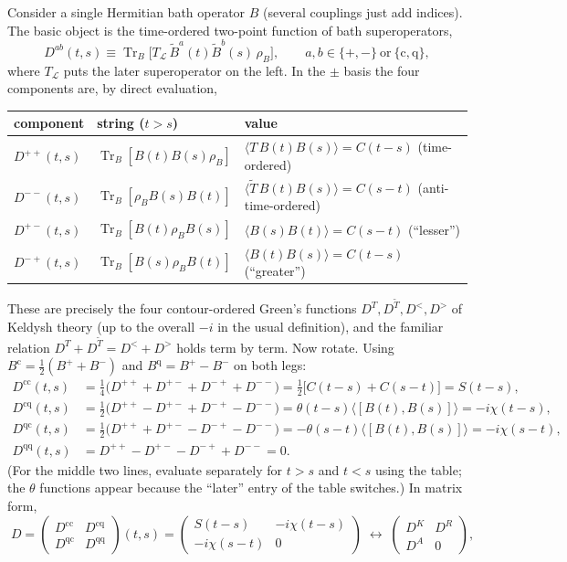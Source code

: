 \documentclass[11pt]{article}
\newcommand{\Tr}{\operatorname{Tr}}
\newcommand{\Lc}{\mathcal{L}}
\newcommand{\cl}{\mathrm{c}}
\newcommand{\qu}{\mathrm{q}}
\newcommand{\rhoB}{\rho_{B}}
\newcommand{\avg}[1]{\langle#1\rangle}
\begin{document}
Consider a single Hermitian bath operator $B$ (several couplings just add indices). The
basic object is the time-ordered two-point function of bath superoperators,
\begin{equation}
  D^{ab}(t,s)\equiv\Tr_B\!\big[T_{\!\Lc}\,\tilde B^{a}(t)\tilde B^{b}(s)\,\rhoB\big],\qquad a,b\in\{+,-\}\ \text{or}\ \{\cl,\qu\},
\end{equation}
where $T_{\!\Lc}$ puts the later superoperator on the left. In the $\pm$ basis the four
components are, by direct evaluation,
\begin{center}
\renewcommand{\arraystretch}{1.3}
\begin{tabular}{@{}lll@{}}
\toprule
component & string ($t>s$) & value \\
\midrule
$D^{++}(t,s)$ & $\Tr_B[B(t)B(s)\rhoB]$ & $\avg{T\,B(t)B(s)}=C(t-s)$ \quad (time-ordered)\\
$D^{--}(t,s)$ & $\Tr_B[\rhoB B(s)B(t)]$ & $\avg{\tilde T\,B(t)B(s)}=C(s-t)$ \quad (anti-time-ordered)\\
$D^{+-}(t,s)$ & $\Tr_B[B(t)\rhoB B(s)]$ & $\avg{B(s)B(t)}=C(s-t)$ \quad (``lesser'')\\
$D^{-+}(t,s)$ & $\Tr_B[B(s)\rhoB B(t)]$ & $\avg{B(t)B(s)}=C(t-s)$ \quad (``greater'')\\
\bottomrule
\end{tabular}
\end{center}
These are precisely the four contour-ordered Green's functions
$D^{T},D^{\tilde T},D^{<},D^{>}$ of Keldysh theory (up to the overall $-i$ in the usual
definition), and the familiar relation $D^T+D^{\tilde T}=D^<+D^>$ holds term by term.
Now rotate. Using $B^\cl=\frac12(B^++B^-)$ and $B^\qu=B^+-B^-$ on both legs:
\begin{align}
  D^{\cl\cl}(t,s)&=\tfrac14\big(D^{++}+D^{+-}+D^{-+}+D^{--}\big)
   =\tfrac12\big[C(t-s)+C(s-t)\big]=S(t-s),\\
  D^{\cl\qu}(t,s)&=\tfrac12\big(D^{++}-D^{+-}+D^{-+}-D^{--}\big)
   =\theta(t-s)\avg{[B(t),B(s)]}=-i\chi(t-s),\\
  D^{\qu\cl}(t,s)&=\tfrac12\big(D^{++}+D^{+-}-D^{-+}-D^{--}\big)
   =-\theta(s-t)\avg{[B(t),B(s)]}=-i\chi(s-t),\\
  D^{\qu\qu}(t,s)&=D^{++}-D^{+-}-D^{-+}+D^{--}=0 .
\end{align}
(For the middle two lines, evaluate separately for $t>s$ and $t<s$ using the table; the
$\theta$ functions appear because the ``later'' entry of the table switches.) In matrix form,
\begin{equation}
  \boxed{\;
  D=\begin{pmatrix} D^{\cl\cl} & D^{\cl\qu}\\ D^{\qu\cl} & D^{\qu\qu}\end{pmatrix}(t,s)
   =\begin{pmatrix} S(t-s) & -i\chi(t-s)\\ -i\chi(s-t) & 0\end{pmatrix}
   \;\leftrightarrow\;
   \begin{pmatrix} D^K & D^R\\ D^A & 0\end{pmatrix},\;}
  \label{eq:LO}
\end{equation}
\end{document}
